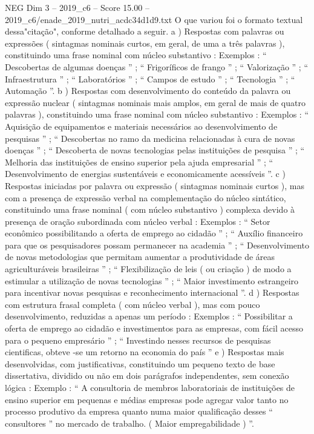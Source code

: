 \begin{textsample}{NEG Dim 3 – 2019\_c6 – Score 15.00 – 2019\_c6/enade\_2019\_nutri\_acdc34d1d9.txt}
O que variou foi o formato textual dessa"citação", conforme detalhado a seguir. a ) Respostas com palavras ou expressões ( sintagmas nominais curtos, em geral, de uma a três palavras ), constituindo uma frase nominal com núcleo substantivo : Exemplos : “ Descobertas de algumas doenças ” ; “ Frigoríficos de frango ” ; “ Valorização ” ; “ Infraestrutura ” ; “ Laboratórios ” ; “ Campos de estudo ” ; “ Tecnologia ” ; “ Automação ”. b ) Respostas com desenvolvimento do conteúdo da palavra ou expressão nuclear ( sintagmas nominais mais amplos, em geral de mais de quatro palavras ), constituindo uma frase nominal com núcleo substantivo : Exemplos : “ Aquisição de equipamentos e materiais necessários ao desenvolvimento de pesquisas ” ; “ Descobertas no ramo da medicina relacionadas à cura de novas doenças ” ; “ Descoberta de novas tecnologias pelas instituições de pesquisa ” ; “ Melhoria das instituições de ensino superior pela ajuda empresarial ” ; “ Desenvolvimento de energias sustentáveis e economicamente acessíveis ”. c ) Respostas iniciadas por palavra ou expressão ( sintagmas nominais curtos ), mas com a presença de expressão verbal na complementação do núcleo sintático, constituindo uma frase nominal ( com núcleo substantivo ) complexa devido à presença de oração subordinada com núcleo verbal : Exemplos : “ Setor econômico possibilitando a oferta de emprego ao cidadão ” ; “ Auxílio financeiro para que os pesquisadores possam permanecer na academia ” ; “ Desenvolvimento de novas metodologias que permitam aumentar a produtividade de áreas agriculturáveis brasileiras ” ; “ Flexibilização de leis ( ou criação ) de modo a estimular a utilização de novas tecnologias ” ; “ Maior investimento estrangeiro para incentivar novas pesquisas e reconhecimento internacional ”. d ) Respostas com estrutura frasal completa ( com núcleo verbal ), mas com pouco desenvolvimento, reduzidas a apenas um período : Exemplos : “ Possibilitar a oferta de emprego ao cidadão e investimentos para as empresas, com fácil acesso para o pequeno empresário ” ; “ Investindo nesses recursos de pesquisas cientificas, obteve -se um retorno na economia do país ” e ) Respostas mais desenvolvidas, com justificativas, constituindo um pequeno texto de base dissertativa, dividido ou não em dois parágrafos independentes, sem conexão lógica : Exemplo : “ A consultoria de membros laboratoriais de instituições de ensino superior em pequenas e médias empresas pode agregar valor tanto no processo produtivo da empresa quanto numa maior qualificação desses “ consultores ” no mercado de trabalho. ( Maior empregabilidade ) ”.

\end{textsample}
